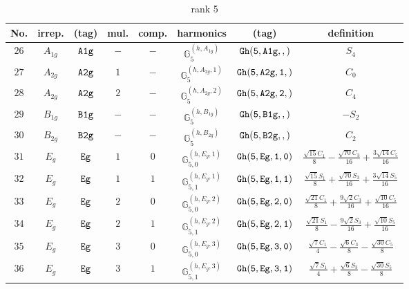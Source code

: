 \documentclass[fleqn,8pt]{jsarticle}
\begin{document}
\begin{table}[ht!]
\begin{center}
\caption{rank 5}
\renewcommand{\arraystretch}{1.3}
\begin{tabular}{cccccccc} \hline \hline
No. & irrep. & (tag) & mul. & comp. & harmonics & (tag) & definition \\ \hline
$ 26 $ & $ A_{1g} $ & $ {\tt A1g} $ & $ - $ & $ - $ & $ \mathbb{G}_{5}^{(h,A_{1g})} $ & $ {\tt Gh(5,A1g,,)} $ & $ S_{4} $ \\
$ 27 $ & $ A_{2g} $ & $ {\tt A2g} $ & $ 1 $ & $ - $ & $ \mathbb{G}_{5}^{(h,A_{2g},1)} $ & $ {\tt Gh(5,A2g,1,)} $ & $ C_{0} $ \\
$ 28 $ & $ A_{2g} $ & $ {\tt A2g} $ & $ 2 $ & $ - $ & $ \mathbb{G}_{5}^{(h,A_{2g},2)} $ & $ {\tt Gh(5,A2g,2,)} $ & $ C_{4} $ \\
$ 29 $ & $ B_{1g} $ & $ {\tt B1g} $ & $ - $ & $ - $ & $ \mathbb{G}_{5}^{(h,B_{1g})} $ & $ {\tt Gh(5,B1g,,)} $ & $ - S_{2} $ \\
$ 30 $ & $ B_{2g} $ & $ {\tt B2g} $ & $ - $ & $ - $ & $ \mathbb{G}_{5}^{(h,B_{2g})} $ & $ {\tt Gh(5,B2g,,)} $ & $ C_{2} $ \\
$ 31 $ & $ E_{g} $ & $ {\tt Eg} $ & $ 1 $ & $ 0 $ & $ \mathbb{G}_{5,0}^{(h,E_{g},1)} $ & $ {\tt Gh(5,Eg,1,0)} $ & $ \frac{\sqrt{15} C_{1}}{8} - \frac{\sqrt{70} C_{3}}{16} + \frac{3 \sqrt{14} C_{5}}{16} $ \\
$ 32 $ & $ E_{g} $ & $ {\tt Eg} $ & $ 1 $ & $ 1 $ & $ \mathbb{G}_{5,1}^{(h,E_{g},1)} $ & $ {\tt Gh(5,Eg,1,1)} $ & $ \frac{\sqrt{15} S_{1}}{8} + \frac{\sqrt{70} S_{3}}{16} + \frac{3 \sqrt{14} S_{5}}{16} $ \\
$ 33 $ & $ E_{g} $ & $ {\tt Eg} $ & $ 2 $ & $ 0 $ & $ \mathbb{G}_{5,0}^{(h,E_{g},2)} $ & $ {\tt Gh(5,Eg,2,0)} $ & $ \frac{\sqrt{21} C_{1}}{8} + \frac{9 \sqrt{2} C_{3}}{16} + \frac{\sqrt{10} C_{5}}{16} $ \\
$ 34 $ & $ E_{g} $ & $ {\tt Eg} $ & $ 2 $ & $ 1 $ & $ \mathbb{G}_{5,1}^{(h,E_{g},2)} $ & $ {\tt Gh(5,Eg,2,1)} $ & $ \frac{\sqrt{21} S_{1}}{8} - \frac{9 \sqrt{2} S_{3}}{16} + \frac{\sqrt{10} S_{5}}{16} $ \\
$ 35 $ & $ E_{g} $ & $ {\tt Eg} $ & $ 3 $ & $ 0 $ & $ \mathbb{G}_{5,0}^{(h,E_{g},3)} $ & $ {\tt Gh(5,Eg,3,0)} $ & $ \frac{\sqrt{7} C_{1}}{4} - \frac{\sqrt{6} C_{3}}{8} - \frac{\sqrt{30} C_{5}}{8} $ \\
$ 36 $ & $ E_{g} $ & $ {\tt Eg} $ & $ 3 $ & $ 1 $ & $ \mathbb{G}_{5,1}^{(h,E_{g},3)} $ & $ {\tt Gh(5,Eg,3,1)} $ & $ \frac{\sqrt{7} S_{1}}{4} + \frac{\sqrt{6} S_{3}}{8} - \frac{\sqrt{30} S_{5}}{8} $ \\
 \hline \hline
\end{tabular}
\end{center}
\end{table}
\end{document}
